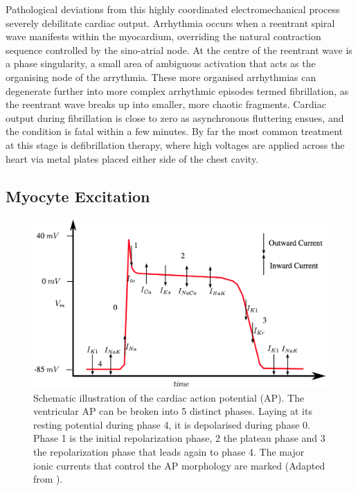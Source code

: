     Pathological deviations from this highly coordinated electromechanical process severely debilitate cardiac output. Arrhythmia occurs when a reentrant spiral wave manifests within the myocardium, overriding the natural contraction sequence controlled by the sino-atrial node. At the centre of the reentrant wave is a phase singularity, a small area of ambiguous activation that acts as the organising node of the arrythmia. These more organised arrhythmias can degenerate further into more complex arrhythmic episodes termed fibrillation, as the reentrant wave breaks up into smaller, more chaotic fragments. Cardiac output during fibrillation is close to zero as asynchronous fluttering ensues, and the condition is fatal within a few minutes. By far the most common treatment at this stage is defibrillation therapy, where high voltages are applied across the heart via metal plates placed either side of the chest cavity.
    
  \subsection{Myocyte Excitation}
  \label{sub:myocyte_excitation}
    \begin{figure}[htbp]
      \centering
      \includegraphics[width=\textwidth]{Ch2/Figs/action_potential}
      \caption{Schematic illustration of the cardiac action potential (AP). The ventricular AP can be broken into 5 distinct phases. Laying at its resting potential during phase 4, it is depolarised during phase 0. Phase 1 is the initial repolarization phase, 2 the plateau phase and 3 the repolarization phase that leads again to phase 4. The major ionic currents that control the AP morphology are marked (Adapted from \cite{BordasThesis}).}
      \label{fig:action_potential}
    \end{figure}
    
